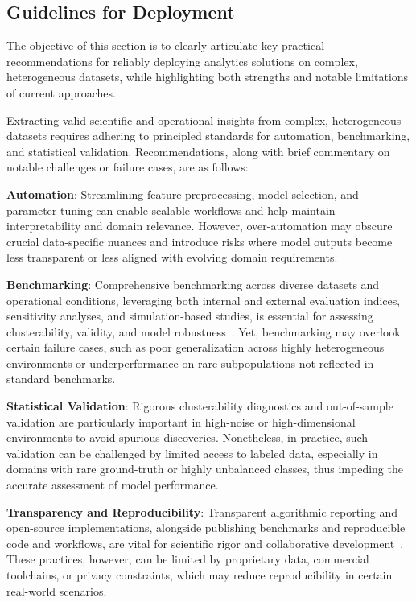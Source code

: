 \documentclass[sigconf]{acmart}
\begin{document}
\subsection{Guidelines for Deployment}

The objective of this section is to clearly articulate key practical recommendations for reliably deploying analytics solutions on complex, heterogeneous datasets, while highlighting both strengths and notable limitations of current approaches.

Extracting valid scientific and operational insights from complex, heterogeneous datasets requires adhering to principled standards for automation, benchmarking, and statistical validation. Recommendations, along with brief commentary on notable challenges or failure cases, are as follows:

\textbf{Automation}: Streamlining feature preprocessing, model selection, and parameter tuning can enable scalable workflows and help maintain interpretability and domain relevance. However, over-automation may obscure crucial data-specific nuances and introduce risks where model outputs become less transparent or less aligned with evolving domain requirements.

\textbf{Benchmarking}: Comprehensive benchmarking across diverse datasets and operational conditions, leveraging both internal and external evaluation indices, sensitivity analyses, and simulation-based studies, is essential for assessing clusterability, validity, and model robustness~\cite{ref117}. Yet, benchmarking may overlook certain failure cases, such as poor generalization across highly heterogeneous environments or underperformance on rare subpopulations not reflected in standard benchmarks.

\textbf{Statistical Validation}: Rigorous clusterability diagnostics and out-of-sample validation are particularly important in high-noise or high-dimensional environments to avoid spurious discoveries. Nonetheless, in practice, such validation can be challenged by limited access to labeled data, especially in domains with rare ground-truth or highly unbalanced classes, thus impeding the accurate assessment of model performance.

\textbf{Transparency and Reproducibility}: Transparent algorithmic reporting and open-source implementations, alongside publishing benchmarks and reproducible code and workflows, are vital for scientific rigor and collaborative development~\cite{ref116}. These practices, however, can be limited by proprietary data, commercial toolchains, or privacy constraints, which may reduce reproducibility in certain real-world scenarios.
\end{document}
